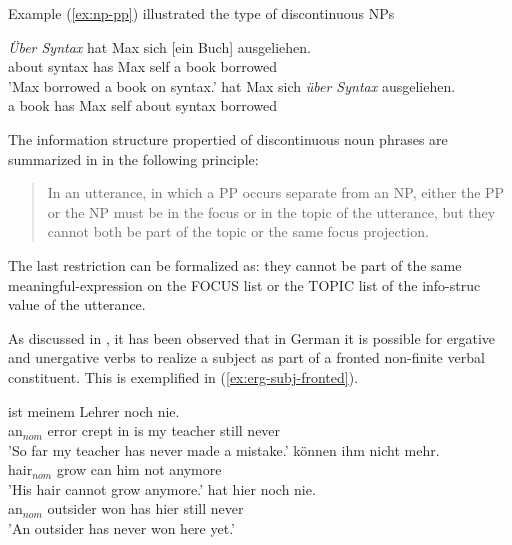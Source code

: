 \documentclass[output=paper]{langsci/langscibook}
\begin{document}
Example (\ref{ex:np-pp}) illustrated the type of discontinuous NPs 
\begin{exe}
  \ex\label{ex:np-pp} \begin{xlist}
    \ex\label{ex:simple-fronted-pp}\gll \textsl{Über Syntax} hat Max sich [ein
 Buch] ausgeliehen.\\
         {about syntax} has Max self { a} book borrowed\\
       \trans 'Max borrowed a book on syntax.'
    \ex\label{ex:simple-fronted-np} hat Max sich \textsl{über Syntax}    ausgeliehen.\\
 { a} book has Max self {about syntax} borrowed\\
\end{xlist}
\end{exe}

The information structure propertied of discontinuous noun phrases are
summarized in \cite{deKuthy2002a} in the following principle:
\begin{quote}
  In an utterance, in which a PP occurs separate from an NP, either
  the PP or the NP must be in the focus or in the topic of the
  utterance, but they cannot both be part of the topic or the same
  focus projection.
\end{quote}

The last restriction can be formalized as: they cannot be part of the
same meaningful-expression on the FOCUS list or the TOPIC list of the
info-struc value of the utterance.

As discussed in \cite{dKM2003a}, it has been observed
that in German it is possible for ergative  and unergative verbs to realize a subject
as part of a fronted non-finite verbal constituent. This is
exemplified in (\ref{ex:erg-subj-fronted}).

\begin{exe}
\ex\label{ex:erg-subj-fronted}
  \begin{xlist}
  \ex\label{ex:erg-subj-fronted-indef} ist meinem Lehrer noch nie.\\
         {\LB}an$_{nom}$ error {crept in} is my teacher still never\\
         \trans 'So far my teacher has never made a mistake.'
  \ex{} können ihm nicht mehr.\\
          {\LB}hair$_{nom}$ grow can him not anymore\\
          \trans 'His hair cannot grow anymore.'
\ex\label{ex:nonerg-subj-fronted}
       hat hier noch nie.\\
           {\LB}an$_{nom}$ outsider won has hier still never\\
        \trans 'An outsider has never won here yet.'
  \end{xlist}
\end{exe}
\end{document}
